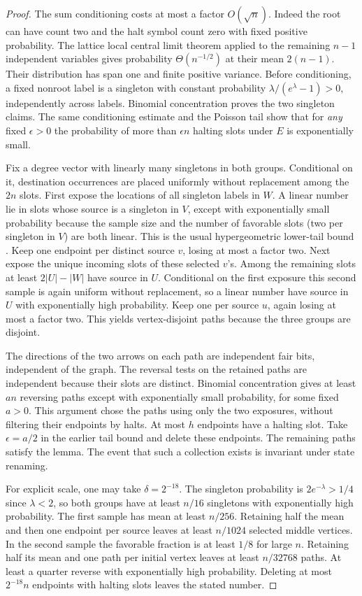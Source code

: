 \documentclass[11pt]{article}
\begin{document}
\begin{proof}
The sum conditioning costs at most a factor $O(\sqrt n)$. Indeed the root can have count two and the halt symbol count zero with fixed positive probability. The lattice local central limit theorem applied to the remaining $n-1$ independent variables gives probability $\Theta(n^{-1/2})$ at their mean $2(n-1)$. Their distribution has span one and finite positive variance. Before conditioning, a fixed nonroot label is a singleton with constant probability $\lambda/(e^\lambda-1)>0$, independently across labels. Binomial concentration proves the two singleton claims. The same conditioning estimate and the Poisson tail show that for \emph{any} fixed $\epsilon>0$ the probability of more than $\epsilon n$ halting slots under $E$ is exponentially small.

Fix a degree vector with linearly many singletons in both groups. Conditional on it, destination occurrences are placed uniformly without replacement among the $2n$ slots. First expose the locations of all singleton labels in $W$. A linear number lie in slots whose source is a singleton in $V$, except with exponentially small probability because the sample size and the number of favorable slots (two per singleton in $V$) are both linear. This is the usual hypergeometric lower-tail bound \cite{hoeffding}. Keep one endpoint per distinct source $v$, losing at most a factor two. Next expose the unique incoming slots of these selected $v$'s. Among the remaining slots at least $2|U|-|W|$ have source in $U$. Conditional on the first exposure this second sample is again uniform without replacement, so a linear number have source in $U$ with exponentially high probability. Keep one per source $u$, again losing at most a factor two. This yields vertex-disjoint paths because the three groups are disjoint.

The directions of the two arrows on each path are independent fair bits, independent of the graph. The reversal tests on the retained paths are independent because their slots are distinct. Binomial concentration gives at least $a n$ reversing paths except with exponentially small probability, for some fixed $a>0$. This argument chose the paths using only the two exposures, without filtering their endpoints by halts. At most $h$ endpoints have a halting slot. Take $\epsilon=a/2$ in the earlier tail bound and delete these endpoints. The remaining paths satisfy the lemma. The event that such a collection exists is invariant under state renaming.

For explicit scale, one may take $\delta=2^{-18}$. The singleton probability is $2e^{-\lambda}>1/4$ since $\lambda<2$, so both groups have at least $n/16$ singletons with exponentially high probability. The first sample has mean at least $n/256$. Retaining half the mean and then one endpoint per source leaves at least $n/1024$ selected middle vertices. In the second sample the favorable fraction is at least $1/8$ for large $n$. Retaining half its mean and one path per initial vertex leaves at least $n/32768$ paths. At least a quarter reverse with exponentially high probability. Deleting at most $2^{-18}n$ endpoints with halting slots leaves the stated number.
\end{proof}
\end{document}
